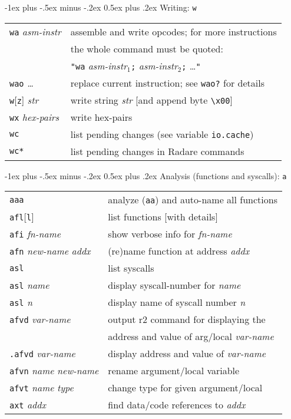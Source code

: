 \documentclass[a4paper,landscape]{article}
\makeatletter
\renewcommand{\section}{\@startsection{section}{1}{0mm}%
                                {-1ex plus -.5ex minus -.2ex}%
                                {0.5ex plus .2ex}%
                                {\normalfont\large\bfseries}}
\makeatother
\begin{document}
\begin{multicols*}{3}
\section{Writing: \texttt{w}}
\begin{tabular}{@{}ll@{}}
\texttt{wa} \textit{asm-instr} & assemble and write opcodes; for more instructions \\ &
	the whole command must be quoted: \\ &
\texttt{"wa} \textit{asm-instr$_1$}\texttt{;} \textit{asm-instr$_2$}\texttt{;} \ldots\texttt{"} \\
\texttt{wao} \textit{\ldots} & replace current instruction; see \texttt{wao?} for details \\
\texttt{w}[\texttt{z}] \textit{str} & write string \textit{str} [and append byte \texttt{\textbackslash x00}] \\
\texttt{wx} \textit{hex-pairs} & write hex-pairs \\
\texttt{wc} & list pending changes (see variable \texttt{io.cache}) \\
\texttt{wc*} & list pending changes in Radare commands \\
\end{tabular}

\section{Analysis (functions and syscalls): \texttt{a}}
\begin{tabular}{@{}ll@{}}
\texttt{aaa} & analyze (\texttt{aa}) and auto-name all functions \\
\texttt{afl}[\texttt{l}] & list functions [with details] \\
\texttt{afi} \textit{fn-name} & show verbose info for \textit{fn-name} \\
\texttt{afn} \textit{new-name} \textit{addx} & (re)name function at address \textit{addx} \\
\texttt{asl} & list syscalls \\
\texttt{asl} \textit{name} & display syscall-number for \textit{name} \\
\texttt{asl} \textit{n} & display name of syscall number \textit{n} \\
\texttt{afvd} \textit{var-name} & output r2 command for displaying the \\ & address and value of arg/local \textit{var-name} \\
\texttt{.afvd} \textit{var-name} & display address and value of \textit{var-name} \\
\texttt{afvn} \textit{name} \textit{new-name} & rename argument/local variable \\
\texttt{afvt} \textit{name} \textit{type} & change type for given argument/local \\
\texttt{axt} \textit{addx} & find data/code references to \textit{addx} \\
\end{tabular}

\end{multicols*}
\end{document}
